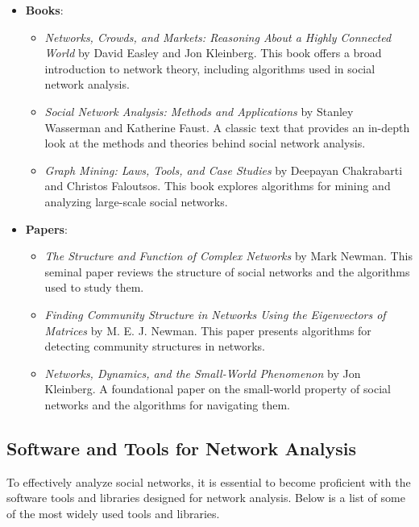 \documentclass[12pt]{book} %
\begin{document}
\begin{itemize}
    \item \textbf{Books}:
        \begin{itemize}
            \item \textit{Networks, Crowds, and Markets: Reasoning About a Highly Connected World} by David Easley and Jon Kleinberg. This book offers a broad introduction to network theory, including algorithms used in social network analysis.
            \item \textit{Social Network Analysis: Methods and Applications} by Stanley Wasserman and Katherine Faust. A classic text that provides an in-depth look at the methods and theories behind social network analysis.
            \item \textit{Graph Mining: Laws, Tools, and Case Studies} by Deepayan Chakrabarti and Christos Faloutsos. This book explores algorithms for mining and analyzing large-scale social networks.
        \end{itemize}
    
    \item \textbf{Papers}:
        \begin{itemize}
            \item \textit{The Structure and Function of Complex Networks} by Mark Newman. This seminal paper reviews the structure of social networks and the algorithms used to study them.
            \item \textit{Finding Community Structure in Networks Using the Eigenvectors of Matrices} by M. E. J. Newman. This paper presents algorithms for detecting community structures in networks.
            \item \textit{Networks, Dynamics, and the Small-World Phenomenon} by Jon Kleinberg. A foundational paper on the small-world property of social networks and the algorithms for navigating them.
        \end{itemize}
\end{itemize}

\subsection{Software and Tools for Network Analysis}
To effectively analyze social networks, it is essential to become proficient with the software tools and libraries designed for network analysis. Below is a list of some of the most widely used tools and libraries.
\end{document}
